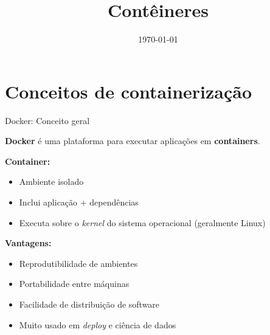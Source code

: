 \documentclass{beamer}
\title{Contêineres}
\date{\today}
\begin{document}
    


\section{Conceitos de containerização}
\begin{frame}{Docker: Conceito geral}
    
    \textbf{Docker} é uma plataforma para executar aplicações em \textbf{containers}.
    
    \vspace{0.4cm}
    
    \textbf{Container:}
    
    \begin{itemize}
        \item Ambiente isolado
        \item Inclui aplicação + dependências
        \item Executa sobre o \textit{kernel} do sistema operacional (geralmente Linux)
    \end{itemize}
    
    \vspace{0.4cm}
    
    \textbf{Vantagens:}
    
    \begin{itemize}
        \item Reprodutibilidade de ambientes
        \item Portabilidade entre máquinas
        \item Facilidade de distribuição de software
        \item Muito usado em \textit{deploy} e ciência de dados
    \end{itemize}
    
\end{frame}
\end{document}
